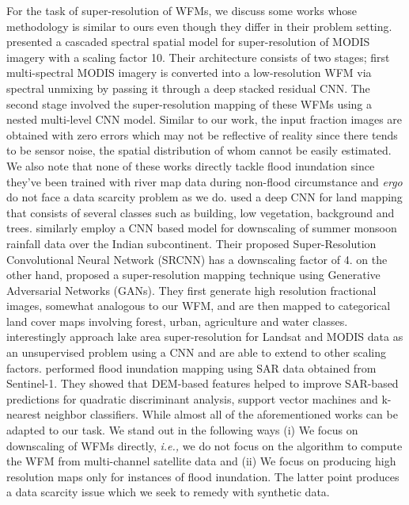 For the task of super-resolution of \acp{WFM}, we discuss some works whose methodology is similar to ours even though they differ in their problem setting. \cite{Yin2022} presented a cascaded spectral spatial model for super-resolution of MODIS imagery with a scaling factor 10. Their architecture consists of two stages; first multi-spectral MODIS imagery is converted into a low-resolution \ac{WFM} via spectral unmixing by passing it through a deep stacked residual \ac{CNN}. The second stage involved the super-resolution mapping of these \acp{WFM} using a nested multi-level \ac{CNN} model. Similar to our work, the input fraction images are obtained with zero errors which may not be reflective of reality since there tends to be sensor noise, the spatial distribution of whom cannot be easily estimated. We also note that none of these works directly tackle flood inundation since they've been trained with river map data during non-flood circumstance and \textit{ergo} do not face a data scarcity problem as we do. 
\cite{Jia2019} used a deep \ac{CNN} for land mapping that consists of several classes such as building, low vegetation, background and trees. 
\cite{Kumar2021} similarly employ a \ac{CNN} based model for downscaling of summer monsoon rainfall data over the Indian subcontinent. Their proposed Super-Resolution Convolutional Neural Network (SRCNN) has a downscaling factor of 4. 
\cite{Shang2022} on the other hand, proposed a super-resolution mapping technique using Generative Adversarial Networks (GANs). They first generate high resolution fractional images, somewhat analogous to our \ac{WFM}, and are then mapped to categorical land cover maps involving forest, urban, agriculture and water classes. 
\cite{Qin2020} interestingly approach lake area super-resolution for Landsat and MODIS data as an unsupervised problem using a \ac{CNN} and are able to extend to other scaling factors. \cite{AristizabalInundationMapping2020} performed flood inundation mapping using \ac{SAR} data obtained from Sentinel-1. They showed that \ac{DEM}-based features helped to improve \ac{SAR}-based predictions for quadratic discriminant analysis, support vector machines and k-nearest neighbor classifiers. While almost all of the aforementioned works can be adapted to our task. We stand out in the following ways (i) We focus on downscaling of \acp{WFM} directly, \textit{i.e.,} we do not focus on the algorithm to compute the \ac{WFM} from multi-channel satellite data and (ii) We focus on producing high resolution maps only for instances of flood inundation. The latter point produces a data scarcity issue which we seek to remedy with synthetic data. 


